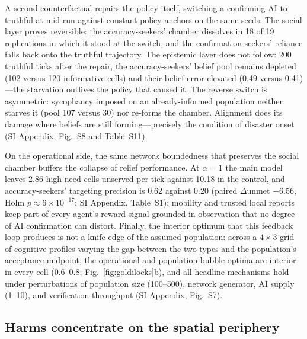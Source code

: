 \documentclass[pdflatex,sn-nature]{sn-jnl}
\begin{document}
A second counterfactual repairs the policy itself, switching a confirming AI to truthful at mid-run against constant-policy anchors on the same seeds. The social layer proves reversible: the accuracy-seekers' chamber dissolves in 18 of 19 replications in which it stood at the switch, and the confirmation-seekers' reliance falls back onto the truthful trajectory. The epistemic layer does not follow: 200 truthful ticks after the repair, the accuracy-seekers' belief pool remains depleted (102 versus 120 informative cells) and their belief error elevated (0.49 versus 0.41)---the starvation outlives the policy that caused it. The reverse switch is asymmetric: sycophancy imposed on an already-informed population neither starves it (pool 107 versus 30) nor re-forms the chamber. Alignment does its damage where beliefs are still forming---precisely the condition of disaster onset (SI Appendix, Fig.~S8 and Table~S11).

On the operational side, the same network boundedness that preserves the social chamber buffers the collapse of relief performance. At $\alpha=1$ the main model leaves 2.86 high-need cells unserved per tick against 10.18 in the control, and accuracy-seekers' targeting precision is 0.62 against 0.20 (paired $\Delta$unmet $-6.56$, Holm $p \approx 6\times10^{-17}$; SI Appendix, Table~S1); mobility and trusted local reports keep part of every agent's reward signal grounded in observation that no degree of AI confirmation can distort. Finally, the interior optimum that this feedback loop produces is not a knife-edge of the assumed population: across a $4 \times 3$ grid of cognitive profiles varying the gap between the two types and the population's acceptance midpoint, the operational and population-bubble optima are interior in every cell (0.6--0.8; Fig.~\ref{fig:goldilocks}b), and all headline mechanisms hold under perturbations of population size (100--500), network generator, AI supply (1--10), and verification throughput (SI Appendix, Fig.~S7).

\subsection{Harms concentrate on the spatial periphery}\label{sec:claim4}
\end{document}
